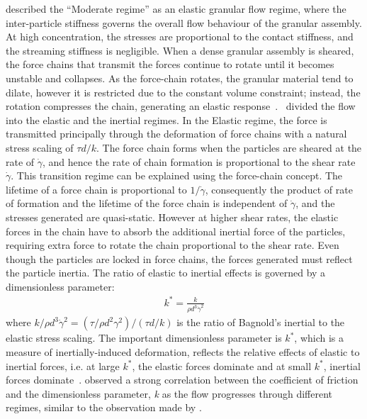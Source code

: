 \citet{Campbell2002} described the ``Moderate regime'' as an elastic granular 
flow regime, where the inter-particle stiffness governs the overall flow 
behaviour of the granular assembly. At high concentration, the stresses are 
proportional to the contact stiffness, and the streaming stiffness is 
negligible. When a dense granular assembly is sheared, the force chains that 
transmit the forces continue to rotate until it becomes unstable and collapses. 
As the force-chain rotates, the granular material tend to dilate, however it is 
restricted due to the constant volume constraint; instead, the rotation 
compresses the chain, generating an elastic 
response~\citep{Campbell2006}.~\citet{Campbell2002} divided the flow into the 
elastic and the inertial regimes. In the Elastic regime, the force is 
transmitted principally through the deformation of force chains with a natural 
stress scaling of $\tau \textit{d}/\textit{k}$. The force chain forms when the 
particles are sheared at the rate of $\dot{\gamma}$, and hence the rate of 
chain formation is proportional to the shear rate $\dot{\gamma}$. This 
transition regime can be explained using the force-chain concept. The lifetime 
of a force chain is proportional to $1/\dot{\gamma}$, consequently the product 
of rate of formation and the lifetime of the force chain is independent of 
$\dot{\gamma}$, and the stresses generated are quasi-static. However at higher 
shear rates, the elastic forces in the chain have to absorb the additional 
inertial force of the particles, requiring extra force to rotate the chain 
proportional to the shear rate. Even though the particles are locked in force 
chains, the forces generated must reflect the particle inertia. The ratio of 
elastic to inertial effects is governed by a dimensionless parameter:
\begin{align}
\textit{k}^{*} = \frac{k}{\rho \textit{d}^{3} \dot{\gamma}^{2}}
\end{align}
where ${k}/{\rho \textit{d}^{3} \dot{\gamma}^{2}}=({\tau}/{\rho \textit{d}^{2} 
{\gamma}^{2}})/(\tau\textit{d}/\textit{k})$ is the ratio of Bagnold's inertial 
to the elastic stress scaling. The important dimensionless parameter is 
$\textit{k}^{*}$, which is a measure of inertially-induced deformation, 
reflects the relative effects of elastic to inertial forces, i.e. at large 
$\textit{k}^{*}$, the elastic forces dominate and at small $\textit{k}^{*}$, 
inertial forces dominate~\citep{Campbell2006}. \citet{Campbell2002} observed a 
strong correlation between the coefficient of friction and the dimensionless 
parameter, \textit{k} as the flow progresses through different regimes, similar 
to the observation made by \citet{Kamrin2010}. 

